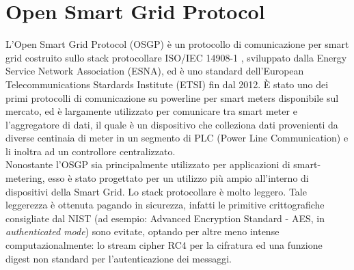 \section{Open Smart Grid Protocol \label{sez:OSGP}}
L'Open Smart Grid Protocol (OSGP) \cite{osgp} è un protocollo di comunicazione per smart grid costruito sullo stack protocollare ISO/IEC 14908-1 \cite{standard14908}, sviluppato dalla Energy Service Network Association (ESNA), ed è uno standard dell'European Telecommunications Stardards Institute (ETSI) fin dal 2012. È stato uno dei primi protocolli di comunicazione su powerline per smart meters disponibile sul mercato, ed è largamente utilizzato per comunicare tra smart meter e l'aggregatore di dati, il quale è un dispositivo che colleziona dati provenienti da diverse centinaia di meter in un segmento di PLC (Power Line Communication) e li inoltra ad un controllore centralizzato.\\
Nonostante l'OSGP sia principalmente utilizzato per applicazioni di smart-metering, esso è stato progettato per un utilizzo più ampio all'interno di dispositivi della Smart Grid. Lo stack protocollare è molto leggero. Tale leggerezza è ottenuta pagando in sicurezza, infatti le primitive crittografiche consigliate dal NIST  (ad esempio: Advanced Encryption Standard - AES, in \emph{authenticated mode}) sono evitate, optando per altre meno intense computazionalmente: lo stream cipher RC4 per la cifratura ed una funzione digest non standard per l'autenticazione dei messaggi.\\
